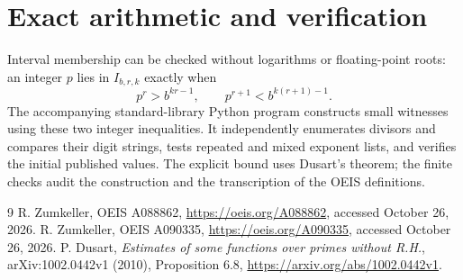 \documentclass[10pt]{article}
\begin{document}
\section{Exact arithmetic and verification}
Interval membership can be checked without logarithms or floating-point
roots: an integer $p$ lies in $I_{b,r,k}$ exactly when
\[
 p^r>b^{kr-1},\qquad p^{r+1}<b^{k(r+1)-1}.
\]
The accompanying standard-library Python program constructs small
witnesses using these two integer inequalities. It independently
enumerates divisors and compares their digit strings, tests repeated
and mixed exponent lists, and verifies the initial published values.
The explicit bound uses Dusart's theorem; the finite checks audit the
construction and the transcription of the OEIS definitions.

\begin{thebibliography}{9}
 R. Zumkeller, OEIS A088862,
\url{https://oeis.org/A088862}, accessed October 26, 2026.
 R. Zumkeller, OEIS A090335,
\url{https://oeis.org/A090335}, accessed October 26, 2026.
 P. Dusart, \emph{Estimates of some functions over primes
without R.H.}, arXiv:1002.0442v1 (2010), Proposition 6.8,
\url{https://arxiv.org/abs/1002.0442v1}.
\end{thebibliography}
\end{document}
